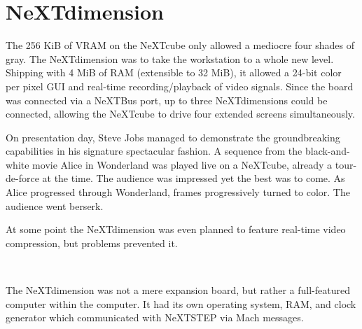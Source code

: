 \section{NeXTdimension}
\vspace{-3pt}
The 256 KiB of VRAM on the NeXTcube only allowed a mediocre four shades of gray. The NeXTdimension was to take the workstation to a whole new level. Shipping with 4 MiB of RAM (extensible to 32 MiB), it allowed a 24-bit color per pixel GUI and real-time recording/playback of video signals. Since the board was connected via a NeXTBus port, up to three NeXTdimensions could be connected, allowing the NeXTcube to drive four extended screens simultaneously.\\
\par
On presentation day, Steve Jobs managed to demonstrate the groundbreaking capabilities in his signature spectacular fashion. A sequence from the black-and-white movie Alice in Wonderland was played live on a NeXTcube, already a tour-de-force at the time. The audience was impressed yet the best was to come. As Alice progressed through Wonderland, frames progressively turned to color. The audience went berserk.\\
\par
At some point the NeXTdimension was even planned to feature real-time video compression, but problems prevented it.\\
\par
{}\\
\par
The NeXTdimension was not a mere expansion board, but rather a full-featured computer within the computer. It had its own operating system, RAM, and clock generator which communicated with NeXTSTEP via Mach messages.\\
\par
{}
